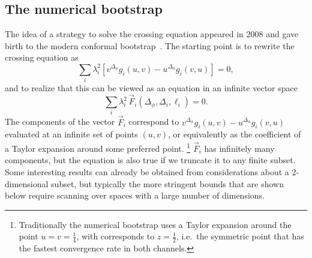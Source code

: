 \documentclass[a4paper,12pt]{article}
\numberwithin{equation}{section}
\begin{document}
\subsection{The numerical bootstrap}

The idea of a strategy to solve the crossing equation appeared in 2008 and gave birth to the modern conformal bootstrap~\cite{Rattazzi:2008pe}.
The starting point is to rewrite the crossing equation as
\begin{equation}
	\sum_i \lambda_i^2 \left[ v^{\Delta_\phi} g_i(u,v)
	- u^{\Delta_\phi} g_i(v,u) \right] = 0,
\end{equation}
and to realize that this can be viewed as an equation in an infinite vector space
\begin{equation}
	\sum_i \lambda_i^2 \, \vec{F}_i(\Delta_\phi, \Delta_i, \ell_i) = 0.
	\label{eq:crossingequation:vector}
\end{equation}
The components of the vector $\vec{F}_i$ correspond to $v^{\Delta_\phi} g_i(u,v) - u^{\Delta_\phi} g_i(v,u)$ evaluated at an infinite set of points $(u,v)$, or equivalently as the coefficient of a Taylor expansion around some preferred point.%
%
\footnote{Traditionally the numerical bootstrap uses a Taylor expansion around the point $u = v = \frac{1}{4}$, with corresponds to $z = \frac{1}{2}$, i.e.~the symmetric point that has the fastest convergence rate in both channels.}
%
$\vec{F}_i$ has infinitely many components, but the equation is also true if we truncate it to any finite subset. Some interesting results can already be obtained from considerations about a 2-dimensional subset, but typically the more stringent bounds that are shown below require scanning over spaces with a large number of dimensions.
\end{document}
